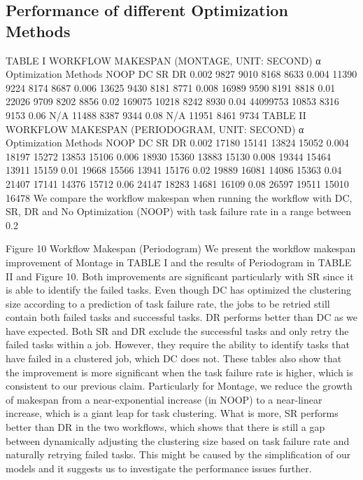 \documentclass{IOS-Book-Article}
\begin{document}
\subsection{Performance of different Optimization Methods}
TABLE I	WORKFLOW MAKESPAN (MONTAGE, UNIT: SECOND) 
α	Optimization Methods
	NOOP	DC	SR	DR
0.002	9827	9010	8168	8633
0.004	11390	9224	8174	8687
0.006	13625	9430	8181	8771
0.008	16989	9590	8191	8818
0.01	22026	9709	8202	8856
0.02	169075	10218	8242	8930
0.04	44099753	10853	8316	9153
0.06	N/A 	11488	8387	9344
0.08	N/A	11951	8461	9734
TABLE II	WORKFLOW MAKESPAN (PERIODOGRAM, UNIT: SECOND) 
α	Optimization Methods
	NOOP	DC	SR	DR
0.002	17180	15141	13824	15052
0.004	18197	15272	13853	15106
0.006	18930	15360	13883	15130
0.008	19344	15464	13911	15159
0.01	19668	15566	13941	15176
0.02	19889	16081	14086	15363
0.04	21407	17141	14376	15712
0.06	24147	18283	14681	16109
0.08	26597	19511	15010	16478
We compare the workflow makespan when running the workflow with DC, SR, DR and No Optimization (NOOP) with task failure rate in a range between 0.2%

 
Figure 10	Workflow Makespan (Periodogram)
We present the workflow makespan improvement of Montage in TABLE I and the results of Periodogram in TABLE II and Figure 10. Both improvements are significant particularly with SR since it is able to identify the failed tasks. Even though DC has optimized the clustering size according to a prediction of task failure rate, the jobs to be retried still contain both failed tasks and successful tasks. DR performs better than DC as we have expected. Both SR and DR exclude the successful tasks and only retry the failed tasks within a job. However, they require the ability to identify tasks that have failed in a clustered job, which DC does not. These tables also show that the improvement is more significant when the task failure rate is higher, which is consistent to our previous claim. Particularly for Montage, we reduce the growth of makespan from a near-exponential increase (in NOOP) to a near-linear increase, which is a giant leap for task clustering. What is more, SR performs better than DR in the two workflows, which shows that there is still a gap between dynamically adjusting the clustering size based on task failure rate and naturally retrying failed tasks. This might be caused by the simplification of our models and it suggests us to investigate the performance issues further.
\end{document}
